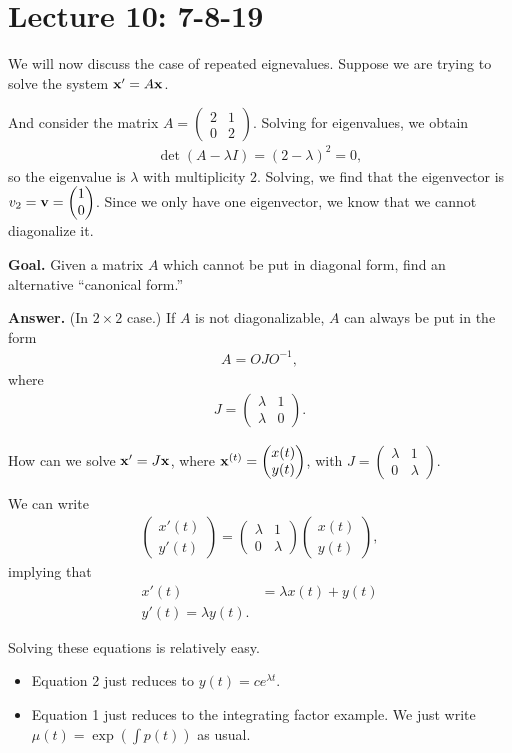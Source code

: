 \documentclass{article}
\newcommand{\mat}[1]{\begin{pmatrix}#1\end{pmatrix}}
\begin{document}
  \section{Lecture 10: 7-8-19}

  We will now discuss the case of repeated eignevalues.  Suppose we are trying to solve the system $\mathbf{x}' = A \mathbf{x}$.

  And consider the matrix $A = \mat{2 & 1 \\ 0 & 2}$.  Solving for eigenvalues, we obtain
  \begin{align*}
    \det (A - \lambda I) = (2 - \lambda)^2 = 0,
  \end{align*}
  so the eigenvalue is $\lambda$ with multiplicity $2$.  Solving, we find that the eigenvector is $v_2 = \mbf{v} = \mat{1 \\ 0}$.  Since we only have one eigenvector, we know that we cannot diagonalize it.

  {\bf Goal.} Given a matrix $A$ which cannot be put in diagonal form, find an alternative ``canonical form.''

  {\bf Answer.} (In $2 \times 2$ case.) If $A$ is not diagonalizable, $A$ can always be put in the form
  \begin{align*}
    A = O J O^{-1},
  \end{align*}
  where
  \begin{align*}
    J = \mat{\lambda & 1 \\ \lambda & 0}.
  \end{align*}

  How can we solve $\mathbf{x}' = J \mathbf{x}$, where $\mbf{x}^{(t)} = \mat{x(t) \\ y(t)}$, with $J = \mat{\lambda & 1 \\ 0 & \lambda}$.

We can write
\begin{align*}
  \mat{x'(t) \\ y'(t)} = \mat{\lambda & 1 \\ 0 & \lambda} \mat{x(t) \\ y(t)},
\end{align*}
implying that
\begin{align*}
  x'(t) &= \lambda x(t) + y(t) \\
  y'(t) = \lambda y(t).
\end{align*}

Solving these equations is relatively easy.
\begin{itemize}
  \item Equation 2 just reduces to $y(t) = c e^{\lambda t}$.
  \item Equation 1 just reduces to the integrating factor example.  We just write $\mu(t) = \exp (\int p(t))$ as usual.
\end{itemize}
\end{document}
